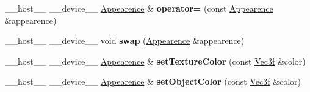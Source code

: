 \begin{DoxyCompactItemize}
\item 
\+\_\+\+\_\+host\+\_\+\+\_\+ \+\_\+\+\_\+device\+\_\+\+\_\+ \hyperlink{struct_appearence}{Appearence} \& {\bfseries operator=} (const \hyperlink{struct_appearence}{Appearence} \&appearence)\hypertarget{struct_appearence_a215010bb496f5e494c75c08ca95efb38}{}\label{struct_appearence_a215010bb496f5e494c75c08ca95efb38}

\item 
\+\_\+\+\_\+host\+\_\+\+\_\+ \+\_\+\+\_\+device\+\_\+\+\_\+ void {\bfseries swap} (\hyperlink{struct_appearence}{Appearence} \&appearence)\hypertarget{struct_appearence_adc2b4fb34c57083f6dfa2c7c0f649ad5}{}\label{struct_appearence_adc2b4fb34c57083f6dfa2c7c0f649ad5}

\item 
\+\_\+\+\_\+host\+\_\+\+\_\+ \+\_\+\+\_\+device\+\_\+\+\_\+ \hyperlink{struct_appearence}{Appearence} \& {\bfseries set\+Texture\+Color} (const \hyperlink{class_vec3}{Vec3f} \&color)\hypertarget{struct_appearence_acd9891785713ff01647c274cf69eabd1}{}\label{struct_appearence_acd9891785713ff01647c274cf69eabd1}

\item 
\+\_\+\+\_\+host\+\_\+\+\_\+ \+\_\+\+\_\+device\+\_\+\+\_\+ \hyperlink{struct_appearence}{Appearence} \& {\bfseries set\+Object\+Color} (const \hyperlink{class_vec3}{Vec3f} \&color)\hypertarget{struct_appearence_af4d5747defd895032f8e3e8b142fbbc9}{}\label{struct_appearence_af4d5747defd895032f8e3e8b142fbbc9}

\end{DoxyCompactItemize}
